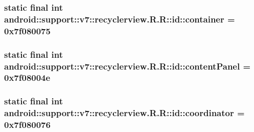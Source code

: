 \hypertarget{classandroid_1_1support_1_1v7_1_1recyclerview_1_1_r_1_1id_0815893fe890ae5d494757acf9ab89e2}{
\subsubsection[{container}]{\setlength{\rightskip}{0pt plus 5cm}static final int android::support::v7::recyclerview.R.R::id::container = 0x7f080075}}
\label{classandroid_1_1support_1_1v7_1_1recyclerview_1_1_r_1_1id_0815893fe890ae5d494757acf9ab89e2}


\hypertarget{classandroid_1_1support_1_1v7_1_1recyclerview_1_1_r_1_1id_f146b866d54e81a8d6e3d0242a4b2ebb}{
\subsubsection[{contentPanel}]{\setlength{\rightskip}{0pt plus 5cm}static final int android::support::v7::recyclerview.R.R::id::contentPanel = 0x7f08004e}}
\label{classandroid_1_1support_1_1v7_1_1recyclerview_1_1_r_1_1id_f146b866d54e81a8d6e3d0242a4b2ebb}


\hypertarget{classandroid_1_1support_1_1v7_1_1recyclerview_1_1_r_1_1id_ce68d9216d08a2b177c8732c9b592f9f}{
\subsubsection[{coordinator}]{\setlength{\rightskip}{0pt plus 5cm}static final int android::support::v7::recyclerview.R.R::id::coordinator = 0x7f080076}}
\label{classandroid_1_1support_1_1v7_1_1recyclerview_1_1_r_1_1id_ce68d9216d08a2b177c8732c9b592f9f}



